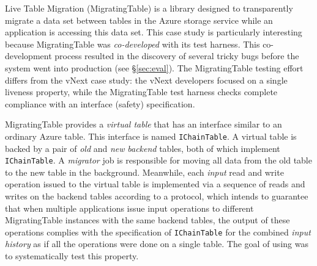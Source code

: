 Live Table Migration (MigratingTable) is a library designed to transparently migrate a data set between tables in the Azure storage service while an application is accessing this data set. This case study is particularly interesting because MigratingTable was \emph{co-developed} with its \psharp test harness. This co-development process resulted in the discovery of several tricky bugs before the system went into production (see \S\ref{sec:eval}). The MigratingTable testing effort differs from the vNext case study: the vNext developers focused on a single liveness property, while the MigratingTable test harness checks complete compliance with an interface (safety) specification.

MigratingTable provides a \emph{virtual table} that has an interface
similar to an ordinary Azure table. This interface is
named \texttt{IChainTable}. A virtual table is backed by a pair
of \emph{old} and \emph{new} \emph{backend} tables, both of which
implement \texttt{IChainTable}. A \emph{migrator} job is responsible
for moving all data from the old table to the new table in the
background. Meanwhile, each \emph{input} read and write operation
issued to the virtual table is implemented via a sequence
of reads and writes on the backend tables according to a protocol,
which intends to guarantee that when multiple applications issue input
operations to different MigratingTable instances with the same backend
tables, the output of these operations complies with the specification
of \texttt{IChainTable} for the combined \emph{input history} as if
all the operations were done on a single table. The goal of
using \psharp was to systematically test this property.

